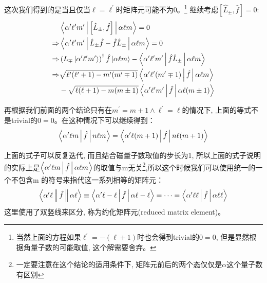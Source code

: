 这次我们得到的是当且仅当$\ell=\ell^\prime$时矩阵元可能不为0。\footnote{当然上面的方程如果$\ell^\prime=-(\ell+1)$时也会得到trivial的$0=0$, 但是显然根据角量子数的可能取值, 这个解需要舍弃。}
继续考虑$\left[\hat{L}_\pm,\hat{f}\right]=0$:
\begin{align*}
    &\Braket{\alpha^\prime   \ell^\prime   m^\prime  |\left[\hat{L}_\pm,\hat{f}\right]|\alpha \ell m}=0\\
    \Rightarrow&\Braket{\alpha^\prime   \ell^\prime   m^\prime  |\hat{L}_\pm\hat{f}-\hat{f}\hat{L}_\pm|\alpha \ell m}=0\\
    \Rightarrow&\left(L_\mp\ket{\alpha^\prime   \ell^\prime   m^\prime  }\right)^\dagger\hat{f}\ket{\alpha\ell m}-\Braket{\alpha^\prime   \ell^\prime   m^\prime  |\hat{f}\hat{L}_\pm|\alpha\ell m}\\
    \Rightarrow&\sqrt{\ell^\prime(\ell^\prime+1)-m^\prime(m^\prime\mp 1)}\Braket{\alpha^\prime   \ell^\prime   (m^\prime\mp 1)  |\hat{f}|\alpha \ell m}\\
    &-\sqrt{\ell(\ell+1)-m(m\pm 1)}\Braket{\alpha^\prime   \ell^\prime   m^\prime  |\hat{f}|\alpha \ell (m\pm 1)}
\end{align*}

再根据我们前面的两个结论只有在$m^\prime=m+1 \wedge \ell^\prime=\ell$的情况下, 上面的等式不是trivial的$0=0$。在这种情况下可以继续得到：
\begin{equation}
    \Braket{\alpha^\prime\ell m|\hat{f}|n\ell m}=\Braket{\alpha^\prime\ell (m+1)|\hat{f}|n\ell (m+1)}
\end{equation}

上面的式子可以反复迭代, 而且结合磁量子数取值的步长为1, 所以上面的式子说明的实际上是$\Braket{\alpha^\prime \ell m|\hat{f}|\alpha\ell m}$的取值与m无关\footnote{一定要注意在这个结论的适用条件下, 矩阵元前后的两个态仅仅是$\alpha$这个量子数有区别},所以这个时候我们可以使用统一的一个不包含m 的符号来指代这一系列相等的矩阵元：
\begin{equation}
    \label{eq:6.53}
    \Braket{\alpha^\prime \ell \|\hat{f}\|\alpha\ell }\equiv\Braket{\alpha^\prime \ell -\ell|\hat{f}|\alpha\ell -\ell}=\cdots=\Braket{\alpha^\prime \ell \ell|\hat{f}|\alpha\ell \ell}
\end{equation}
这里使用了双竖线来区分, 称为约化矩阵元(reduced matrix element)。

